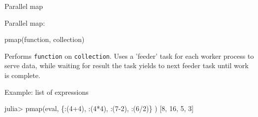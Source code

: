 \documentclass{beamer}
\begin{document}
	\begin{frame}[fragile]{Parallel map}
		\begin{block}{Parallel map:}
		\begin{semiverbatim}
			pmap(function, collection)
		\end{semiverbatim}
		\end{block}
		Performs \verb+function+ on \verb+collection+. Uses a 'feeder' task for each worker process to serve data, while waiting for result the task yields to next feeder task until work is complete. 
		\begin{block}{Example: list of expressions}
			\begin{semiverbatim}
				julia> pmap(eval, \{:(4+4), :(4*4), :(7-2), :(6/2)\} )
				[8, 16, 5, 3]
			\end{semiverbatim}
		\end{block}
	\end{frame}
\end{document}
